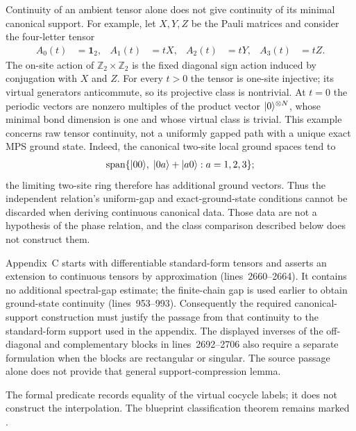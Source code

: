 \documentclass{article}
\begin{document}
Continuity of an ambient tensor alone does not give continuity of its
minimal canonical support. For example, let $X,Y,Z$ be the Pauli matrices
and consider the four-letter tensor
\begin{align}
    A_0(t) & =\mathbf{1}_2, &
    A_1(t) & =tX,          &
    A_2(t) & =tY,          &
    A_3(t) & =tZ.
    \label{eq:spc11_spt_interpolation_upper_range_pauli_tensor}
\end{align}
The on-site action of $\mathbb Z_2\times\mathbb Z_2$ is the fixed diagonal
sign action induced by conjugation with $X$ and $Z$. For every $t>0$ the
tensor is one-site injective; its virtual generators anticommute, so its
projective class is nontrivial. At $t=0$ the periodic vectors are nonzero
multiples of the product vector $|0\rangle^{\otimes N}$, whose minimal bond
dimension is one and whose virtual class is trivial. This example concerns
raw tensor continuity, not a uniformly gapped path with a unique exact MPS
ground state. Indeed, the canonical two-site local ground spaces tend to
\begin{align}
    \operatorname{span}\{|00\rangle,\;
    |0a\rangle+|a0\rangle:a=1,2,3\};
    \label{eq:spc11_spt_interpolation_upper_range_limiting_local_ground_space}
\end{align}
the limiting two-site ring therefore has additional ground vectors.
Thus the independent relation's uniform-gap and exact-ground-state
conditions cannot be discarded when deriving continuous canonical data.
Those data are not a hypothesis of the phase relation, and the class
comparison described below does not construct them.

Appendix~C starts with differentiable standard-form tensors and asserts an
extension to continuous tensors by approximation (lines~2660--2664).
It contains no additional spectral-gap estimate; the finite-chain gap is
used earlier to obtain ground-state continuity (lines~953--993).
Consequently the required canonical-support construction must justify the
passage from that continuity to the standard-form support used in the
appendix. The displayed inverses of the off-diagonal and complementary
blocks in lines~2692--2706 also require a separate formulation when the
blocks are rectangular or singular. The source passage alone does not
provide that general support-compression lemma.

The formal predicate  records equality of the
virtual cocycle labels; it does not construct the interpolation. The blueprint
classification theorem remains marked .
\end{document}
